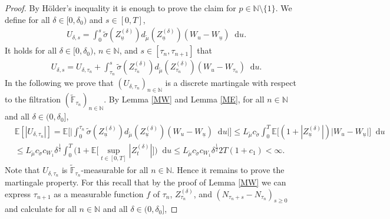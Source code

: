 \documentclass[11pt,a4paper]{article}
\numberwithin{equation}{section}
\theoremstyle{definition}
\newcommand{\E}{{\mathbb{E}}}
\newcommand{\N}{{\mathbb{N}}}
\newcommand{\diff}{\mathop{}\!\mathrm{d}}
\begin{document}
\begin{proof}
    By Hölder's inequality it is enough to prove the claim for $p\in\N\setminus \{1\}$.
    We define for all $\delta\in[0,\delta_0)$ and $s\in[0,T]$,
    \begin{equation}\label{M13}
        \begin{aligned}
        &U_{\delta,s} = \int_0^s  \widetilde\sigma(Z^{(\delta)}_{\underline u}) d_{\widetilde\mu}(Z^{(\delta)}_{\underline u}) (W_u-W_{\underline u})  \diff u.
        \end{aligned}
    \end{equation}
    It holds for all $\delta\in[0,\delta_0)$, $n\in\N$, and $s\in[\tau_n,\tau_{n+1}]$ that
    \begin{equation}\label{M14}
        \begin{aligned}
        &U_{\delta,s} =  U_{\delta,\tau_n} + \int_{\tau_n}^s \widetilde\sigma(Z^{(\delta)}_{\tau_n}) d_{\widetilde\mu}(Z^{(\delta)}_{\tau_n}) (W_u-W_{\tau_n}) \diff u.
        \end{aligned}
    \end{equation}
    In the following we prove that $(U_{\delta,\tau_n})_{n\in\N}$ is a discrete martingale with respect to the filtration $(\widetilde{\mathbb{F}}_{\tau_n})_{n\in\N}$. 
    By Lemma \ref{MW} and Lemma \ref{ME}, for all $n\in\N$ and all $\delta\in(0,\delta_0]$,
    \begin{equation}\label{M15}
        \begin{aligned}
        &\E[|U_{\delta,\tau_n}|] 
        = \E\Big[\Big| \int_0^{\tau_n}    \widetilde\sigma(Z^{(\delta)}_{\underline u}) d_{\widetilde\mu}(Z^{(\delta)}_{\underline u}) (W_u-W_{\underline u}) \diff u \Big|\Big]
        \leq L_{\widetilde\mu} c_{\widetilde\sigma} \int_0^{T} \E\Big[  (1+ |Z^{(\delta)}_{\underline u}|) \big| W_u-W_{\underline u}\big|\Big] \diff u \\
        &\leq L_{\widetilde\mu} c_{\widetilde\sigma}c_{W_1} \delta^{\frac{1}{2}} \int_0^{T} \Big( 1+ \E\Big[ \sup_{t\in[0,T]}|Z^{(\delta)}_{t}| \Big]\Big)\diff u 
        \leq L_{\widetilde\mu} c_{\widetilde\sigma}c_{W_1}  \delta^{\frac{1}{2}} 2T ( 1+ c_1) <\infty.
        \end{aligned}
    \end{equation}
    Note that $U_{\delta,\tau_n}$ is $\widetilde{\mathbb{F}}_{\tau_n}$-measurable for all $n\in\N$.
    Hence it remains to prove the martingale property. For this recall that by the proof of Lemma \ref{MW} we can express $\tau_{n+1}$ as a measurable function $f$ of $\tau_n$, $Z^{(\delta)}_{\tau_n}$, and $(N_{\tau_n+s} -N_{\tau_n})_{s\geq 0}$ and calculate for all $n\in\N$ and all $\delta\in(0,\delta_0]$,

\end{proof}
\end{document}
